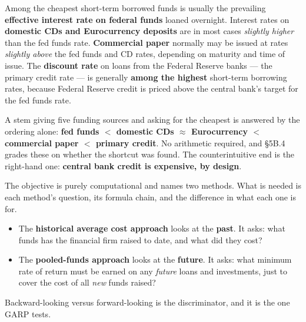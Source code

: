 \begin{lrkeybox}
Among the cheapest short-term borrowed funds is usually the prevailing \textbf{effective interest rate on federal funds} loaned overnight. Interest rates on \textbf{domestic CDs and Eurocurrency deposits} are in most cases \emph{slightly higher} than the fed funds rate. \textbf{Commercial paper} normally may be issued at rates \emph{slightly above} the fed funds and CD rates, depending on maturity and time of issue. The \textbf{discount rate} on loans from the Federal Reserve banks --- the primary credit rate --- is generally \textbf{among the highest} short-term borrowing rates, because Federal Reserve credit is priced above the central bank's target for the fed funds rate.
\end{lrkeybox}

\begin{lrtrapbox}
A stem giving five funding sources and asking for the cheapest is answered by the ordering alone: \textbf{fed funds $<$ domestic CDs $\approx$ Eurocurrency $<$ commercial paper $<$ primary credit}. No arithmetic required, and \S5B.4 grades these on whether the shortcut was found. The counterintuitive end is the right-hand one: \textbf{central bank credit is expensive, by design}.
\end{lrtrapbox}


\gapbadge
{}

\begin{lrgapbox}
The objective is purely computational and names two methods. What is needed is each method's question, its formula chain, and the difference in what each one is for.
\end{lrgapbox}

\begin{lrkeybox}
\begin{itemize}
\item The \textbf{historical average cost approach} looks at the \textbf{past}. It asks: what funds has the financial firm raised to date, and what did they cost?
\item The \textbf{pooled-funds approach} looks at the \textbf{future}. It asks: what minimum rate of return must be earned on any \emph{future} loans and investments, just to cover the cost of all \emph{new} funds raised?
\end{itemize}
Backward-looking versus forward-looking is the discriminator, and it is the one GARP tests.
\end{lrkeybox}


